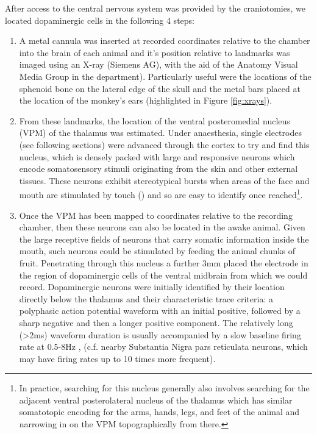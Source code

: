 After access to the central nervous system was provided by the craniotomies, we located dopaminergic cells in the following 4 steps:

\begin{enumerate}
    \item A metal cannula was inserted at recorded coordinates relative to the chamber into the brain of each animal and it's position relative to landmarks was imaged using an X-ray (Siemens AG), with the aid of the Anatomy Visual Media Group in the department). Particularly useful were the locations of the sphenoid bone on the lateral edge of the skull and the metal bars placed at the location of the monkey's ears (highlighted in Figure \ref{fig:xrays}).
    \item From these landmarks, the location of the ventral posteromedial nucleus (VPM) of the thalamus was estimated. Under anaesthesia, single electrodes (see following sections) were advanced through the cortex to try and find this nucleus, which is densely packed with large and responsive neurons which encode somatosensory stimuli originating from the skin and other external tissues. These neurons exhibit stereotypical bursts when areas of the face and mouth are stimulated by touch (\cite{loeBodyRepresentationVentrobasal1977}) and so are easy to identify once reached\footnote{In practice, searching for this nucleus generally also involves searching for the adjacent ventral posterolateral nucleus of the thalamus which has similar somatotopic encoding for the arms, hands, legs, and feet of the animal and narrowing in on the VPM topographically from there.}.
    \item Once the VPM has been mapped to coordinates relative to the recording chamber, then these neurons can also be located in the awake animal. Given the large receptive fields of neurons that carry somatic information inside the mouth, such neurons could be stimulated by feeding the animal chunks of fruit. Penetrating through this nucleus a further 3mm placed the electrode in the region of dopaminergic cells of the ventral midbrain from which we could record. Dopaminergic neurons were initially identified by their location directly below the thalamus and their characteristic trace criteria: a polyphasic action potential waveform with an initial positive, followed by a sharp negative and then a longer positive component. The relatively long (>2ms) waveform duration is usually accompanied by a slow baseline firing rate at 0.5-8Hz \cite{romoDopamineNeuronsMonkey1990}, \cite{ljungbergResponsesMonkeyDopamine1992} (c.f. nearby Substantia Nigra pars reticulata neurons, which may have firing rates up to 10 times more frequent). 

\end{enumerate}
